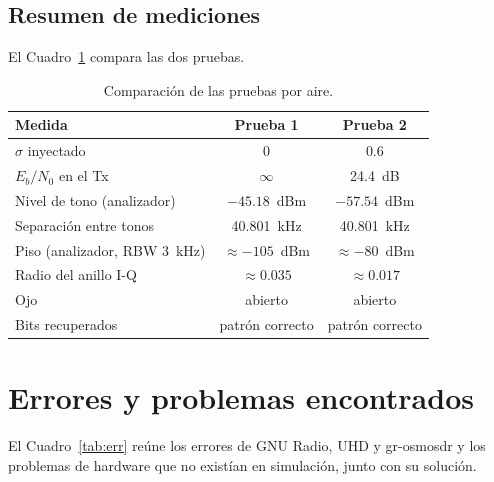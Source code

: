 \documentclass[conference]{IEEEtran}
\begin{document}
\subsection{Resumen de mediciones}

El Cuadro~\ref{tab:med} compara las dos pruebas.

\begin{table}[!t]
\centering
\caption{Comparación de las pruebas por aire.}
\label{tab:med}
\begin{tabular}{lcc}
\toprule
Medida & Prueba 1 & Prueba 2 \\
\midrule
$\sigma$ inyectado & 0 & 0.6 \\
$E_b/N_0$ en el Tx & $\infty$ & 24.4~dB \\
Nivel de tono (analizador) & $-45.18$~dBm & $-57.54$~dBm \\
Separación entre tonos & 40.801~kHz & 40.801~kHz \\
Piso (analizador, RBW 3~kHz) & $\approx -105$~dBm & $\approx -80$~dBm \\
Radio del anillo I-Q & $\approx 0.035$ & $\approx 0.017$ \\
Ojo & abierto & abierto \\
Bits recuperados & patrón correcto & patrón correcto \\
\bottomrule
\end{tabular}
\end{table}

\section{Errores y problemas encontrados}

El Cuadro~\ref{tab:err} reúne los errores de GNU Radio, UHD y gr-osmosdr y los problemas de hardware que no existían en simulación, junto con su solución.
\end{document}
